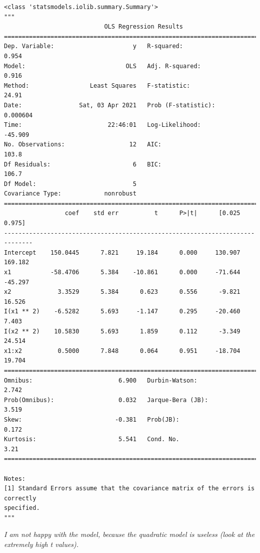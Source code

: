 \documentclass[11pt]{article}
\makeatletter
\newcommand{\boxspacing}{\kern\kvtcb@left@rule\kern\kvtcb@boxsep}
\newcommand{\prompt}[4]{
        \ttfamily\llap{{\color{#2}[#3]:\hspace{3pt}#4}}\vspace{-\baselineskip}
    }
\makeatother
\begin{document}
            \begin{tcolorbox}[breakable, size=fbox, boxrule=.5pt, pad at break*=1mm, opacityfill=0]
\prompt{Out}{outcolor}{6}{\boxspacing}
\begin{Verbatim}[commandchars=\\\{\}]
<class 'statsmodels.iolib.summary.Summary'>
"""
                            OLS Regression Results
==============================================================================
Dep. Variable:                      y   R-squared:                       0.954
Model:                            OLS   Adj. R-squared:                  0.916
Method:                 Least Squares   F-statistic:                     24.91
Date:                Sat, 03 Apr 2021   Prob (F-statistic):           0.000604
Time:                        22:46:01   Log-Likelihood:                -45.909
No. Observations:                  12   AIC:                             103.8
Df Residuals:                       6   BIC:                             106.7
Df Model:                           5
Covariance Type:            nonrobust
==============================================================================
                 coef    std err          t      P>|t|      [0.025      0.975]
------------------------------------------------------------------------------
Intercept    150.0445      7.821     19.184      0.000     130.907     169.182
x1           -58.4706      5.384    -10.861      0.000     -71.644     -45.297
x2             3.3529      5.384      0.623      0.556      -9.821      16.526
I(x1 ** 2)    -6.5282      5.693     -1.147      0.295     -20.460       7.403
I(x2 ** 2)    10.5830      5.693      1.859      0.112      -3.349      24.514
x1:x2          0.5000      7.848      0.064      0.951     -18.704      19.704
==============================================================================
Omnibus:                        6.900   Durbin-Watson:                   2.742
Prob(Omnibus):                  0.032   Jarque-Bera (JB):                3.519
Skew:                          -0.381   Prob(JB):                        0.172
Kurtosis:                       5.541   Cond. No.                         3.21
==============================================================================

Notes:
[1] Standard Errors assume that the covariance matrix of the errors is correctly
specified.
"""
\end{Verbatim}
\end{tcolorbox}
        
    \emph{I am not happy with the model, because the quadratic model is
useless (look at the extremely high t values).}
\end{document}
